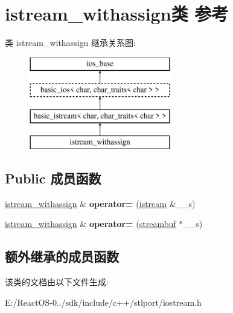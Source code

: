 \hypertarget{classistream__withassign}{}\section{istream\+\_\+withassign类 参考}
\label{classistream__withassign}
类 istream\+\_\+withassign 继承关系图\+:\begin{figure}[H]
\begin{center}
\leavevmode
\includegraphics[height=4.000000cm]{classistream__withassign}
\end{center}
\end{figure}
\subsection*{Public 成员函数}
\begin{DoxyCompactItemize}
\item 
\mbox{\label{classistream__withassign_a5fe39e855cea347ebdaad3b003301418}} 
\hyperlink{classistream__withassign}{istream\+\_\+withassign} \& {\bfseries operator=} (\hyperlink{classbasic__istream}{istream} \&\+\_\+\+\_\+s)
\item 
\mbox{\label{classistream__withassign_aa2bb349eddf8c3f2379b4f43a3f7e02b}} 
\hyperlink{classistream__withassign}{istream\+\_\+withassign} \& {\bfseries operator=} (\hyperlink{classbasic__streambuf}{streambuf} $\ast$\+\_\+\+\_\+s)
\end{DoxyCompactItemize}
\subsection*{额外继承的成员函数}


该类的文档由以下文件生成\+:\begin{DoxyCompactItemize}
\item 
E\+:/\+React\+O\+S-\/0../sdk/include/c++/stlport/iostream.\+h\end{DoxyCompactItemize}
